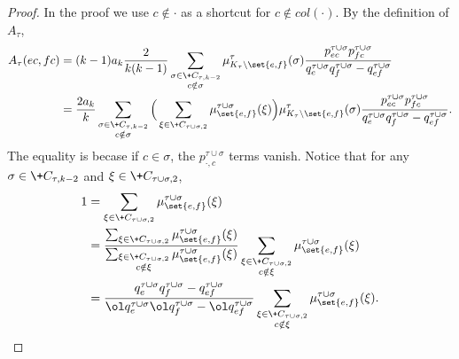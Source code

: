 \begin{proof}
    \newcommand{\taur}{\tau\cup\omega|_{K_\tau\setminus\set{e, f}}}
    In the proof we use $c\notin \cdot$ as a shortcut for $c\notin \!{col}(\cdot)$.
    By the definition of $A_\tau$,
    \begin{align*}
        A_\tau(ec, fc)
        &=  (k-1)a_k\frac{2}{k(k-1)}
              \sum_{\substack{\sigma\in \+C_{\tau, k-2}\\ c\notin\sigma}}
              \mu^\tau_{K_\tau\setminus\set{e, f}}(\sigma)
              \frac{p^{\tau\cup\sigma}_{ec}p^{\tau\cup\sigma}_{fc}}
              {q^{\tau\cup\sigma}_{e}q^{\tau\cup\sigma}_f - q^{\tau\cup\sigma}_{ef}}
      \\&=  \frac{2a_k}{k}
              \sum_{\substack{\sigma\in \+C_{\tau, k-2}\\ c\notin\sigma}}
              \Big(
              \sum_{\xi\in \+C_{\tau\cup\sigma, 2}}
              \mu^{\tau\cup\sigma}_{\set{e, f}}(\xi)
              \Big)
              \mu^\tau_{K_\tau\setminus\set{e, f}}(\sigma)
              \frac{p^{\tau\cup\sigma}_{ec}p^{\tau\cup\sigma}_{fc}}
              {q^{\tau\cup\sigma}_{e}q^{\tau\cup\sigma}_f - q^{\tau\cup\sigma}_{ef}}.
    \end{align*}
    The equality is becase if $c\in \sigma$, the $p^{\tau\cup\sigma}_{\cdot, c}$ terms vanish.
    Notice that for any $\sigma\in \+C_{\tau, k-2}$ and $\xi\in\+C_{\tau\cup\sigma, 2}$,
    \begin{align*}
        1 &= 
        \sum_{\xi\in \+C_{\tau\cup\sigma, 2}}
        \mu^{\tau\cup\sigma}_{\set{e, f}}(\xi)
        \\&=
        \frac{
        \sum_{\xi\in \+C_{\tau\cup\sigma, 2}}
        \mu^{\tau\cup\sigma}_{\set{e, f}}(\xi)
        }{
        \sum_{\substack{\xi\in \+C_{\tau\cup\sigma, 2}\\ c\notin \xi}}
        \mu^{\tau\cup\sigma}_{\set{e, f}}(\xi)
        }
        \sum_{\substack{\xi\in \+C_{\tau\cup\sigma, 2} \\ c\notin \xi}}
        \mu^{\tau\cup\sigma}_{\set{e, f}}(\xi)
        \\&=
        \frac{
        {q^{\tau\cup\sigma}_{e}q^{\tau\cup\sigma}_f - q^{\tau\cup\sigma}_{ef}}
        }{
        {\ol q^{\tau\cup\sigma}_{e}\ol q^{\tau\cup\sigma}_f - \ol q^{\tau\cup\sigma}_{ef}}
        }
        \sum_{\substack{\xi\in \+C_{\tau\cup\sigma, 2}\\ c\notin \xi}}
        \mu^{\tau\cup\sigma}_{\set{e, f}}(\xi).
    \end{align*}

\end{proof}
